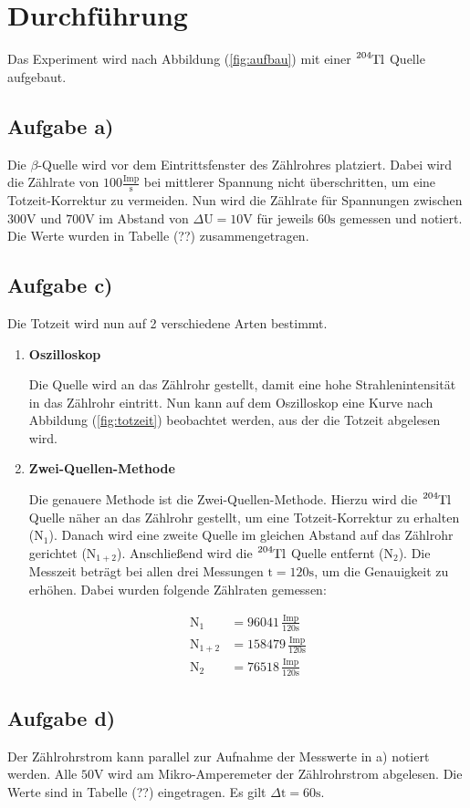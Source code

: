 \section{Durchführung}
Das Experiment wird nach Abbildung (\ref{fig:aufbau}) mit einer $\ce{^{204}Tl}$ Quelle aufgebaut.




\subsection{Aufgabe a)}
Die $\beta$-Quelle wird vor dem Eintrittsfenster des Zählrohres platziert.
Dabei wird die Zählrate von $100\frac{\text{Imp}}{\text{s}}$ bei mittlerer Spannung nicht überschritten, um eine Totzeit-Korrektur zu vermeiden.
Nun wird die Zählrate für Spannungen zwischen $300\si{\volt}$ und $700\si{\volt}$ im Abstand von $\Delta \text{U} =10 \si{\volt}$ für jeweils $60\si{\second}$ gemessen und notiert.
Die Werte wurden in Tabelle (??) zusammengetragen.


\subsection{Aufgabe c)}
Die Totzeit wird nun auf 2 verschiedene Arten bestimmt.
\begin{enumerate}
\item \textbf{Oszilloskop}

Die Quelle wird an das Zählrohr gestellt, damit eine hohe Strahlenintensität in das Zählrohr eintritt.
Nun kann auf dem Oszilloskop eine Kurve nach Abbildung (\ref{fig:totzeit}) beobachtet werden, aus der die Totzeit abgelesen wird.

\item \textbf{Zwei-Quellen-Methode}

Die genauere Methode ist die Zwei-Quellen-Methode.
Hierzu wird die $\ce{^{204}Tl}$ Quelle näher an das Zählrohr gestellt, um eine Totzeit-Korrektur zu erhalten ($\text{N}_1$).
Danach wird eine zweite Quelle im gleichen Abstand auf das Zählrohr gerichtet ($\text{N}_{1+2}$).
Anschließend wird die $\ce{^{204}Tl}$ Quelle entfernt ($\text{N}_2$).
Die Messzeit beträgt bei allen drei Messungen $\text{t}=120 \si{\second}$, um die Genauigkeit zu erhöhen.
Dabei wurden folgende Zählraten gemessen:

\begin{align*}
\text{N}_1 &= 96041 \, \frac{\text{Imp}}{120\si{\second}} \\
\text{N}_{1+2} &= 158479 \, \frac{\text{Imp}}{120\si{\second}} \\
\text{N}_2 &= 76518 \, \frac{\text{Imp}}{120\si{\second}}
\end{align*}

\end{enumerate}

\subsection{Aufgabe d)}
Der Zählrohrstrom kann parallel zur Aufnahme der Messwerte in a) notiert werden.
Alle $50 \si{\volt}$ wird am Mikro-Amperemeter der Zählrohrstrom abgelesen.
Die Werte sind in Tabelle (??) eingetragen.
Es gilt $\Delta \text{t}=60\si{\second}$.